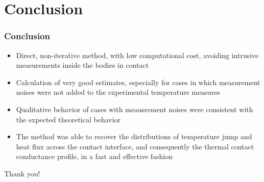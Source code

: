 \documentclass{beamer}
\begin{document}
\section{Conclusion}
\begin{frame}
	\frametitle{Conclusion}
	\begin{itemize}
		\item Direct, non-iterative method, with low computational cost, avoiding intrusive measurements inside the bodies in contact		
	\pause
		\item Calculation of very good estimates, especially for cases in which measurement noises were not added to the experimental temperature measures
	\pause
		\item Qualitative behavior of cases with meausrement noises were consistent with the expected theoretical behavior
	\pause
		\item The method was able to recover the distributions of temperature jump and heat flux across the contact interface, and consequently the thermal contact conductance profile, in a fast and effective fashion
	\end{itemize}
\end{frame}

\begin{frame}
	\centering
	Thank you!
\end{frame}

	
\end{document}
